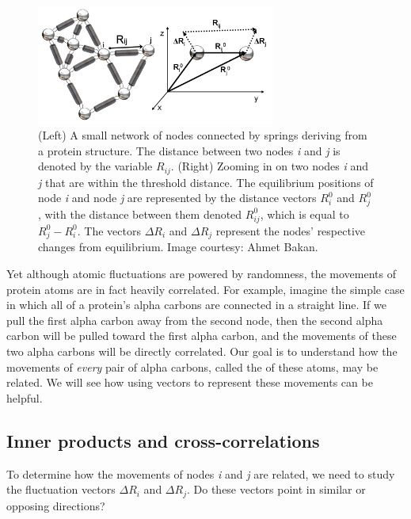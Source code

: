 \begin{figure}[h]
	\centering
	\mySfFamily
	\includegraphics[width = 0.7\textwidth]{../images/gaussian_fluctuations.png}
	\caption{(Left) A small network of nodes connected by springs deriving from a protein structure. The distance between two nodes \textit{i} and \textit{j} is denoted by the variable $ R_{ij} $. (Right) Zooming in on two nodes \textit{i} and \textit{j} that are within the threshold distance. The equilibrium positions of node \textit{i} and node \textit{j} are represented by the distance vectors $ R_i^0 $ and $ R_j^0 $, with the distance between them denoted $ R_{ij}^0 $, which is equal to $ R_j^0 - R_i^0 $. The vectors $ \Delta R_i $ and $ \Delta R_j $ represent the nodes' respective changes from equilibrium. Image courtesy: Ahmet Bakan.}
	\label{fig:gaussian_fluctuations}
\end{figure}

Yet although atomic fluctuations are powered by randomness, the movements of protein atoms are in fact heavily correlated. For example, imagine the simple case in which all of a protein's alpha carbons are connected in a straight line. If we pull the first alpha carbon away from the second node, then the second alpha carbon will be pulled toward the first alpha carbon, and the movements of these two alpha carbons will be directly correlated. Our goal is to understand how the movements of \textit{every} pair of alpha carbons, called the  of these atoms, may be related. We will see how using vectors to represent these movements can be helpful.

\FloatBarrier
{}
\subsection{Inner products and cross-correlations}

To determine how the movements of nodes \textit{i} and \textit{j} are related, we need to study the fluctuation vectors $ \Delta R_i $ and $ \Delta R_j $. Do these vectors point in similar or opposing directions?

